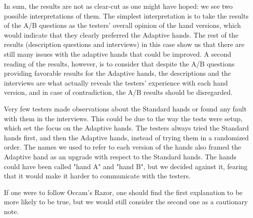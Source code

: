In sum, the results are not as clear-cut as one might have hoped: we see two possible interpretations of them. The simplest interpretation is to take the results of the A/B questions as the testers' overall opinion of the hand versions, which would indicate that they clearly preferred the Adaptive hands. The rest of the results (description questions and interviews) in this case show us that there are still many issues with the adaptive hands that could be improved. A second reading of the results, however, is to consider that despite the A/B questions providing favorable results for the Adaptive hands, the descriptions and the interviews are what actually reveals the testers' experience with each hand version, and in case of contradiction, the A/B results should be disregarded. 

Very few testers made observations about the Standard hands or found any fault with them in the interviews. This could be due to the way the tests were setup, which set the focus on the Adaptive hands. The testers always tried the Standard hands first, and then the Adaptive hands, instead of trying them in a randomized order. The names we used to refer to each version of the hands also framed the Adaptive hand as an upgrade with respect to the Standard hands. The hands could have been called "hand A" and "hand B", but we decided against it, fearing that it would make it harder to communicate with the testers.

If one were to follow Occam's Razor, one should find the first explanation to be more likely to be true, but we would still consider the second one as a cautionary note.